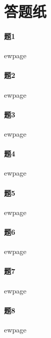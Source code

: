 \documentclass[fontset=fandol]{ctexart}
\begin{document}
\pagestyle{empty}

\section*{\Huge{答题纸}}

\paragraph{题1}

ewpage

\paragraph{题2}

ewpage

\paragraph{题3}

ewpage

\paragraph{题4}

ewpage

\paragraph{题5}

ewpage

\paragraph{题6}

ewpage

\paragraph{题7}

ewpage

\paragraph{题8}

ewpage
\end{document}

